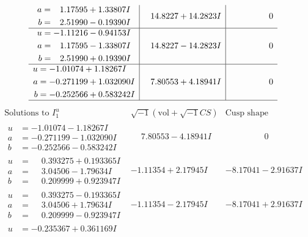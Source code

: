 \documentclass[1p]{elsarticle_modified}
\theoremstyle{definition}
\newcommand{\I}{\sqrt{-1}}
\begin{document}
$$\begin{array}{c|c|c}
\begin{aligned}
a &= \phantom{-}1.17595 + 1.33807 I \\
b &= \phantom{-}2.51990 - 0.19390 I\end{aligned}
 & \phantom{-}14.8227 + 14.2823 I & \phantom{-0.000000 } 0 \\ \hline\begin{aligned}
u &= -1.11216 - 0.94153 I \\
a &= \phantom{-}1.17595 - 1.33807 I \\
b &= \phantom{-}2.51990 + 0.19390 I\end{aligned}
 & \phantom{-}14.8227 - 14.2823 I & \phantom{-0.000000 } 0 \\ \hline\begin{aligned}
u &= -1.01074 + 1.18267 I \\
a &= -0.271199 + 1.032090 I \\
b &= -0.252566 + 0.583242 I\end{aligned}
 & \phantom{-}7.80553 + 4.18941 I & \phantom{-0.000000 } 0\\
 \hline 
 \end{array}$$\newpage$$\begin{array}{c|c|c}  
\text{Solutions to }I^u_{1}& \I (\text{vol} + \sqrt{-1}CS) & \text{Cusp shape}\\
 \hline 
\begin{aligned}
u &= -1.01074 - 1.18267 I \\
a &= -0.271199 - 1.032090 I \\
b &= -0.252566 - 0.583242 I\end{aligned}
 & \phantom{-}7.80553 - 4.18941 I & \phantom{-0.000000 } 0 \\ \hline\begin{aligned}
u &= \phantom{-}0.393275 + 0.193365 I \\
a &= \phantom{-}3.04506 - 1.79634 I \\
b &= \phantom{-}0.209999 + 0.923947 I\end{aligned}
 & -1.11354 + 2.17945 I & -8.17041 - 2.91637 I \\ \hline\begin{aligned}
u &= \phantom{-}0.393275 - 0.193365 I \\
a &= \phantom{-}3.04506 + 1.79634 I \\
b &= \phantom{-}0.209999 - 0.923947 I\end{aligned}
 & -1.11354 - 2.17945 I & -8.17041 + 2.91637 I \\ \hline\begin{aligned}
u &= -0.235367 + 0.361169 I \\

\end{aligned}
\end{array}$$
\end{document}
